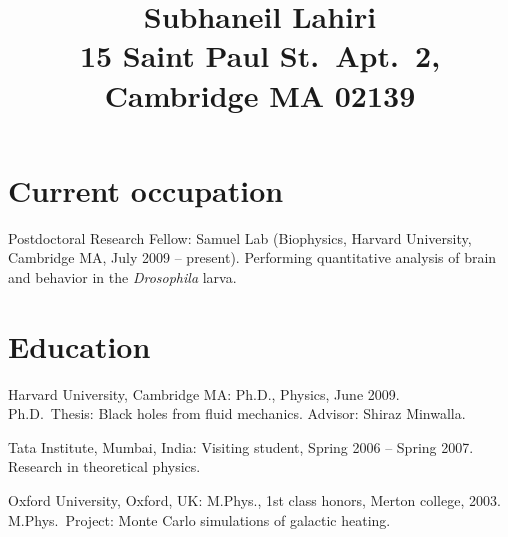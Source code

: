 \documentclass[letterpaper,10pt,notopicbreak,titleabove,plain]{simplecv}
\title{Subhaneil Lahiri%
\\ {\normalfont\normalsize 15 Saint Paul St.\ Apt.\ 2, Cambridge MA 02139}}
\begin{document}
\pagestyle{empty}
\maketitle

\section{Current occupation}
\begin{topic}
\item[Postdoctoral Research Fellow:] Samuel Lab (Biophysics, Harvard University, Cambridge MA, July 2009 -- present). Performing quantitative analysis of brain and behavior in the \emph{Drosophila} larva.
\end{topic}

\section{Education}
\begin{topic}
  \item[Harvard University, Cambridge MA:] Ph.D., Physics, June 2009. \\
  Ph.D.\ Thesis: Black holes from fluid mechanics. Advisor: Shiraz Minwalla.%

  \item[Tata Institute, Mumbai, India:] Visiting student, Spring 2006 -- Spring 2007. Research in theoretical physics.

  \item[Oxford University, Oxford, UK:] M.Phys., 1st class honors, Merton college, 2003. \\
  M.Phys.\ Project: Monte Carlo simulations of galactic heating. %
\end{topic}

%
%
\end{document}
